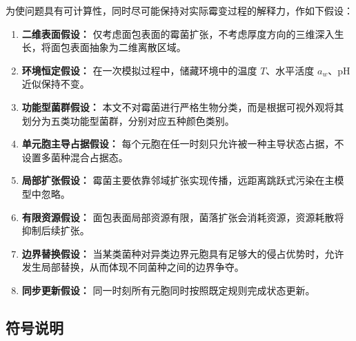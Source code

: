 \documentclass[12pt,a4paper]{ctexart}
\begin{document}
为使问题具有可计算性，同时尽可能保持对实际霉变过程的解释力，作如下假设：

\begin{enumerate}
    \item \textbf{二维表面假设：} 仅考虑面包表面的霉菌扩张，不考虑厚度方向的三维深入生长，将面包表面抽象为二维离散区域。
    \item \textbf{环境恒定假设：} 在一次模拟过程中，储藏环境中的温度 \(T\)、水平活度 \(a_w\)、pH 近似保持不变。
    \item \textbf{功能型菌群假设：} 本文不对霉菌进行严格生物分类，而是根据可视外观将其划分为五类功能型菌群，分别对应五种颜色类别。
    \item \textbf{单元胞主导占据假设：} 每个元胞在任一时刻只允许被一种主导状态占据，不设置多菌种混合占据态。
    \item \textbf{局部扩张假设：} 霉菌主要依靠邻域扩张实现传播，远距离跳跃式污染在主模型中忽略。
    \item \textbf{有限资源假设：} 面包表面局部资源有限，菌落扩张会消耗资源，资源耗散将抑制后续扩张。
    \item \textbf{边界替换假设：} 当某类菌种对异类边界元胞具有足够大的侵占优势时，允许发生局部替换，从而体现不同菌种之间的边界争夺。
    \item \textbf{同步更新假设：} 同一时刻所有元胞同时按照既定规则完成状态更新。
\end{enumerate}

\subsection{符号说明}
\end{document}

